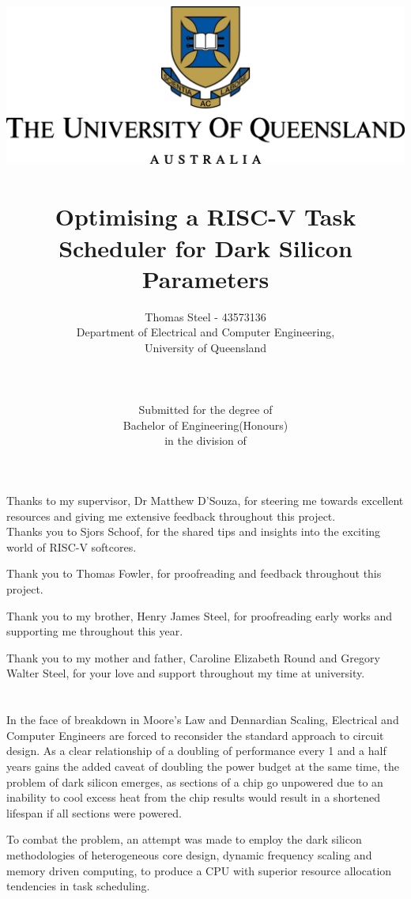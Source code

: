 \documentclass[a4paper,12pt]{report}
\author{Thomas Steel - 43573136\\
	Department of Electrical and Computer Engineering,\\University of Queensland\\
	\\
	\\
	\\
	Submitted for the degree of\\
	Bachelor of Engineering(Honours)\\
	in the division of
}
\title{
	\includegraphics[width=\textwidth]{PNGlogo.png}~\\[1cm]
	Optimising a RISC-V Task Scheduler for Dark Silicon Parameters
}
\begin{document}
	
	\maketitle
	\leavevmode\thispagestyle{empty}\newpage
	
	\thispagestyle{empty}
	
	
	
	\leavevmode\thispagestyle{empty}\newpage
	
	\section*{}
	\begin{center}
		Thanks to my supervisor, Dr Matthew D'Souza, for steering me towards excellent resources and giving me extensive feedback throughout this project. \\
	
		\noindent Thanks you to Sjors Schoof, for the shared tips and insights into the exciting world of RISC-V softcores.
		
		\noindent Thank you to Thomas Fowler, for proofreading and feedback throughout this project.
		
		\noindent Thank you to my brother, Henry James Steel, for proofreading early works and supporting me throughout this year.
		
		\noindent Thank you to my mother and father, Caroline Elizabeth Round and Gregory Walter Steel, for your love and support throughout my time at university.
	\end{center} 
	\leavevmode\thispagestyle{empty}\newpage
	\leavevmode\thispagestyle{empty}\newpage
	\section*{}
	In the face of breakdown in Moore's Law and Dennardian Scaling, Electrical and Computer Engineers are forced to reconsider the standard approach to circuit design. As a clear relationship of a doubling of performance every 1 and a half years gains the added caveat of doubling the power budget at the same time, the problem of dark silicon emerges, as sections of a chip go unpowered due to an inability to cool excess heat from the chip results would result in a shortened lifespan if all sections were powered.
	
	To combat the problem, an attempt was made to employ the dark silicon methodologies of heterogeneous core design, dynamic frequency scaling and memory driven computing, to produce a CPU with superior resource allocation tendencies in task scheduling.
	
\end{document}
